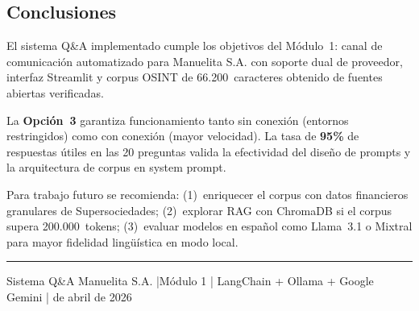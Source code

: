 \documentclass[12pt, a4paper]{article}
\begin{document}
\subsection{Conclusiones}

El sistema Q\&A implementado cumple los objetivos del Módulo~1: canal de comunicación
automatizado para Manuelita S.A. con soporte dual de proveedor, interfaz Streamlit y corpus
OSINT de 66.200~caracteres obtenido de fuentes abiertas verificadas.

La \textbf{Opción~3} garantiza funcionamiento tanto sin conexión (entornos restringidos)
como con conexión (mayor velocidad). La tasa de \textbf{95\%} de respuestas útiles en
las 20 preguntas valida la efectividad del diseño de prompts y la arquitectura de corpus
en system prompt.

Para trabajo futuro se recomienda: (1)~enriquecer el corpus con datos financieros
granulares de Supersociedades; (2)~explorar RAG con ChromaDB si el corpus supera
200.000~tokens; (3)~evaluar modelos en español como Llama~3.1 o Mixtral para mayor
fidelidad lingüística en modo local.

\vspace{1cm}
\rule{\linewidth}{0.5pt}
\begin{center}
  \small\sffamily\color{g2}
  Sistema Q\&A Manuelita S.A. \quad|\quad Módulo 1 \quad|\quad
  LangChain + Ollama + Google Gemini \quad| de abril de 2026
\end{center}
\end{document}
